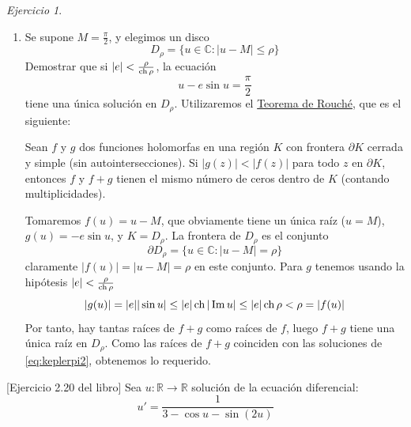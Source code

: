 \documentclass[12pt,spanish]{article}
\theoremstyle{definition}
\theoremstyle{remark}
\newtheorem{exercise}{Ejercicio}
\begin{document}
\begin{exercise}
\begin{enumerate}[$i)$]
\item Se supone $M=\frac{\pi}{2}$, y elegimos un disco
  \[D_\rho = \{u\in\mathbb{C}:|u-M|\leq\rho\}\]
  Demostrar que si $|e|<\frac{\rho}{\operatorname{ch} \rho}$, la ecuación
  \begin{equation}\label{eq:keplerpi2}
      u-e\sin u=\frac{\pi}{2}
    \end{equation}
    tiene una única solución en $D_\rho$.
  Utilizaremos el
  \href{https://en.wikipedia.org/wiki/Rouch%C3%A9's_theorem}
    {Teorema de Rouché}, que es el siguiente:

    Sean $f$ y $g$ dos funciones holomorfas en una región $K$ con
    frontera $\partial K$ cerrada y simple (sin
    autointersecciones). Si $|g(z)|<|f(z)|$ para todo $z$ en
    $\partial K$, entonces $f$ y $f+g$ tienen el mismo número de ceros
    dentro de $K$ (contando multiplicidades).

    Tomaremos $f(u)=u-M$, que obviamente tiene un única raíz ($u=M$),
    $g(u)=-e\sin u$, y $K=D_\rho$. La frontera de $D_\rho$ es el
    conjunto \[\partial D_\rho=\{u\in\mathbb{C}:|u-M|=\rho\}\]
    claramente $|f(u)|=|u-M|=\rho$ en este conjunto. Para $g$ tenemos
    usando la hipótesis $|e|<\frac{\rho}{\operatorname{ch} \rho}$
    \[|g(u)|=|e||\sin u|\leq |e|\operatorname{ch}|\operatorname{Im}u|\leq
      |e|\operatorname{ch}\rho<\rho=|f(u)|\] Por tanto, hay tantas raíces de $f+g$ como
    raíces de $f$, luego $f+g$ tiene una única raíz en $D_\rho$. Como
    las raíces de $f+g$ coinciden con las soluciones de
    \ref{eq:keplerpi2}, obtenemos lo requerido.
    \end{enumerate}
  \end{exercise}

\newpage
  
  [Ejercicio 2.20 del libro] \label{ej:2.20}
  Sea $u:\mathbb{R}\rightarrow\mathbb{R}$ solución de la ecuación
  diferencial:
  \begin{equation} \label{eq:eq-diffU}
    u'=\frac{1}{3-\cos u -\sin(2u)}
  \end{equation}
\end{document}
